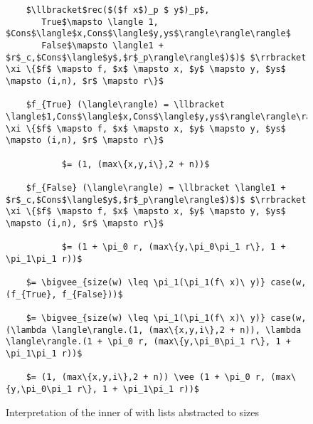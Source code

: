 \begin{figure}[H]
  \caption{Interpretation of the inner  of  with lists abstracted to sizes}
  \label{fig:interp_sizes_inner_rec}
  \begin{lstlisting}
    $\llbracket$rec($($f x$)_p $ y$)_p$,
       True$\mapsto \langle 1, $Cons$\langle$x,Cons$\langle$y,ys$\rangle\rangle\rangle$
       False$\mapsto \langle1 + $r$_c,$Cons$\langle$y$,$r$_p\rangle\rangle$)$)$ $\rrbracket \xi \{$f$ \mapsto f, $x$ \mapsto x, $y$ \mapsto y, $ys$ \mapsto (i,n), $r$ \mapsto r\}$

    $f_{True} (\langle\rangle) = \llbracket \langle$1,Cons$\langle$x,Cons$\langle$y,ys$\rangle\rangle\rangle\rrbracket \xi \{$f$ \mapsto f, $x$ \mapsto x, $y$ \mapsto y, $ys$ \mapsto (i,n), $r$ \mapsto r\}$

           $= (1, (max\{x,y,i\},2 + n))$

    $f_{False} (\langle\rangle) = \llbracket \langle1 + $r$_c,$Cons$\langle$y$,$r$_p\rangle\rangle$)$)$ $\rrbracket \xi \{$f$ \mapsto f, $x$ \mapsto x, $y$ \mapsto y, $ys$ \mapsto (i,n), $r$ \mapsto r\}$

           $= (1 + \pi_0 r, (max\{y,\pi_0\pi_1 r\}, 1 + \pi_1\pi_1 r))$
    
    $= \bigvee_{size(w) \leq \pi_1(\pi_1(f\ x)\ y)} case(w, (f_{True}, f_{False}))$

    $= \bigvee_{size(w) \leq \pi_1(\pi_1(f\ x)\ y)} case(w, (\lambda \langle\rangle.(1, (max\{x,y,i\},2 + n)), \lambda \langle\rangle.(1 + \pi_0 r, (max\{y,\pi_0\pi_1 r\}, 1 + \pi_1\pi_1 r))$

    $= (1, (max\{x,y,i\},2 + n)) \vee (1 + \pi_0 r, (max\{y,\pi_0\pi_1 r\}, 1 + \pi_1\pi_1 r))$
  \end{lstlisting}
\end{figure}

